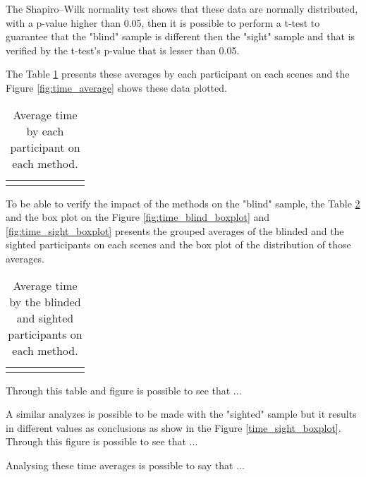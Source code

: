 The Shapiro–Wilk normality test shows that these data are normally distributed, with a p-value higher than 0.05, then it is possible to perform a t-test to guarantee that the "blind" sample is different then the "sight" sample and that is verified by the t-test's p-value that is lesser than 0.05.

The Table \ref{tab:time_average} presents these averages by each participant on each scenes and the Figure \ref{fig:time_average} shows these data plotted.

\begin{table}[!htb]
\centering
\caption{Average time by each participant on each method.}
\label{tab:time_average}
\begin{tabular}{lrrrrrr}
{}
\end{tabular}
\end{table}


To be able to verify the impact of the methods on the "blind" sample, the Table \ref{tab:time_average_group} and the box plot on the Figure \ref{fig:time_blind_boxplot} and \ref{fig:time_sight_boxplot} presents the grouped averages of the blinded and the sighted participants on each scenes and the box plot of the distribution of those averages. 

\begin{table}[!htb]
\centering
\caption{Average time by the blinded and sighted participants on each method.}
\label{tab:time_average_group}
\begin{tabular}{lrrrrrr}
{}
\end{tabular}
\end{table}


Through this table and figure is possible to see that ...

A similar analyzes is possible to be made with the "sighted" sample but it results in different values as conclusions as show in the Figure \ref{time_sight_boxplot}. Through this figure is possible to see that ...


Analysing these time averages is possible to say that ...